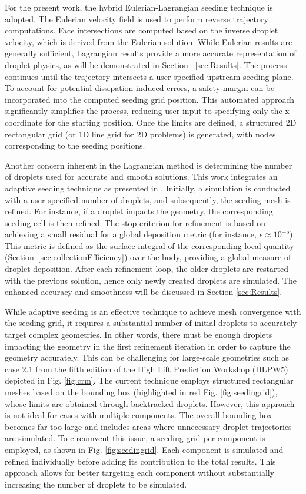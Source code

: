 For the present work, the hybrid Eulerian-Lagrangian seeding technique is adopted. The Eulerian velocity field is used to perform reverse trajectory computations. Face intersections are computed based on the inverse droplet velocity, which is derived from the Eulerian solution. While Eulerian results are generally sufficient, Lagrangian results provide a more accurate representation of droplet physics, as will be demonstrated in Section ~\ref{sec:Results}. The process continues until the trajectory intersects a user-specified upstream seeding plane. To account for potential dissipation-induced errors, a safety margin can be incorporated into the computed seeding grid position. This automated approach significantly simplifies the process, reducing user input to specifying only the x-coordinate for the starting position. Once the limits are defined, a structured 2D rectangular grid (or 1D line grid for 2D problems) is generated, with nodes corresponding to the seeding positions.

 Another concern inherent in the Lagrangian method is determining the number of droplets used for accurate and smooth solutions. This work integrates an adaptive seeding technique as presented in \cite{bellosta2023lagrangian}. Initially, a simulation is conducted with a user-specified number of droplets, and subsequently, the seeding mesh is refined. For instance, if a droplet impacts the geometry, the corresponding seeding cell is then refined. The stop criterion for refinement is based on achieving a small residual for a global deposition metric (for instance, $\epsilon \approx 10^{-5}$). This metric is defined as the surface integral of the corresponding local quantity (Section~\ref{sec:collectionEfficiency}) over the body, providing a global measure of droplet deposition. After each refinement loop, the older droplets are restarted with the previous solution, hence only newly created droplets are simulated. The enhanced accuracy and smoothness  will be discussed in Section \ref{sec:Results}. 
 
 While adaptive seeding is an effective technique to achieve mesh convergence with the seeding grid, it requires a substantial number of initial droplets to accurately target complex geometries. In other words, there must be enough droplets impacting the geometry in the first refinement iteration in order to capture the geometry accurately. This can be challenging for large-scale geometries such as case 2.1 from the fifth edition of the High Lift Prediction Workshop (HLPW5) \cite{clark2025high} depicted in Fig. \ref{fig:crm}. The current technique employs structured rectangular meshes based on the bounding box (highlighted in red Fig. \ref{fig:seedingrid}), whose limits are obtained through backtracked droplets. However, this approach is not ideal for cases with multiple components. The overall bounding box becomes far too large and includes areas where unnecessary droplet trajectories are simulated. To circumvent this issue, a seeding grid per component is employed, as shown in Fig. \ref{fig:seedingrid}. Each component is simulated and refined individually before adding its contribution to the total results. This approach allows for better targeting each component without substantially increasing the number of droplets to be simulated.

